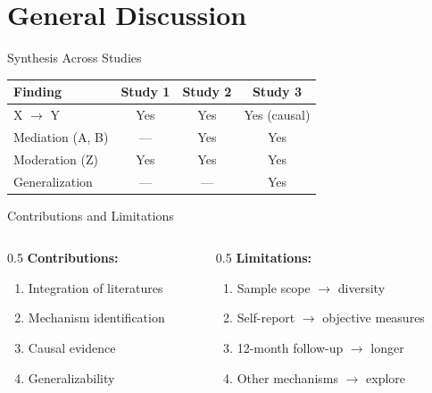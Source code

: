 \documentclass[aspectratio=169,12pt]{beamer}
\begin{document}
\section{General Discussion}

\begin{frame}{Synthesis Across Studies}
  \begin{table}
    \centering\small
    \begin{tabular}{lccc}
      \toprule
      \textbf{Finding} & \textbf{Study 1} & \textbf{Study 2} & \textbf{Study 3} \\
      \midrule
      X $\to$ Y & Yes & Yes & Yes (causal) \\
      Mediation (A, B) & --- & Yes & Yes \\
      Moderation (Z) & Yes & Yes & Yes \\
      Generalization & --- & --- & Yes \\
      \bottomrule
    \end{tabular}
  \end{table}
\end{frame}

\begin{frame}{Contributions and Limitations}
  \begin{columns}[T]
    \begin{column}{0.5\textwidth}
      \textbf{Contributions:}
      \begin{enumerate}
        \item Integration of literatures
        \item Mechanism identification
        \item Causal evidence
        \item Generalizability
      \end{enumerate}
    \end{column}
    \begin{column}{0.5\textwidth}
      \textbf{Limitations:}
      \begin{enumerate}
        \item Sample scope $\to$ diversity
        \item Self-report $\to$ objective measures
        \item 12-month follow-up $\to$ longer
        \item Other mechanisms $\to$ explore
      \end{enumerate}
    \end{column}
  \end{columns}
\end{frame}
\end{document}
